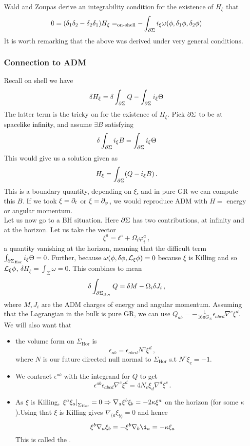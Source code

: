 \documentclass{article}
\begin{document}
Wald and Zoupas derive an integrability condition for the existence of $H_\xi$ that 
\begin{align*}
	0 = (\delta_1 \delta_2 - \delta_2 \delta_1) H_\xi =_{\text{on-shell}} - \int_{\partial \Sigma } i_\xi \omega(\phi, \delta_1 \phi, \delta_2 \phi)
\end{align*}
It is worth remarking that the above was derived under very general conditions. 

\subsubsection{Connection to ADM}
Recall on shell we have 
\[
\delta H_\xi = \delta \int_{\partial \Sigma} Q - \int_{\partial \Sigma} i_\xi \Theta
\]
The latter term is the tricky on for the existence of $H_\xi$. Pick $\partial \Sigma$ to be at spacelike infinity, and assume $\exists B$ satisfying 
\[
\delta \int_{\partial \Sigma} i_\xi B = \int_{\partial \Sigma} i_\xi \Theta
\]
This would give us a solution given as 
\[
H_\xi = \int_{\partial \Sigma} (Q-i_\xi B) \, .
\]
This is a boundary quantity, depending on $\xi$, and in pure GR we can compute this $B$. If we took $\xi = \partial_t$ or $\xi=\partial_\varphi$, we would reproduce ADM with $H=$ energy or angular momentum. \\
Let us now go to a BH situation. Here $\partial \Sigma$ has two contributions, at infinity and at the horizon. Let us take the vector 
\[
\xi^a = t^a + \Omega_i \varphi_i^a \, ,
\]
a quantity vanishing at the horizon, meaning that the difficult term $\int_{\partial \Sigma_{\text{Hor}}} i_\xi \Theta = 0$. Further, because $\omega(\phi, \delta \phi, \mathcal{L}_\xi \phi)=0$ because $\xi$ is Killing and so $\mathcal{L}_\xi \phi$, $\delta H_\xi =\int_\Sigma \omega = 0$. This combines to mean 
\[
\delta \int_{\partial \Sigma_{\text{Hor}}} Q = \delta M - \Omega_i \delta J_i \, ,
\]
where $M, J_i$ are the ADM charges of energy and angular momentum. Assuming that the Lagrangian in the bulk is pure GR, we can use $Q_{ab} = -\frac{1}{16 \pi G_N} \epsilon_{abcd} \nabla^c \xi^d$. We will also want that 
\begin{itemize}
	\item the volume form on $\Sigma_{\text{Hor}}$ is 
	\[
	\epsilon_{ab} = \epsilon_{abcd} N^c \xi^d \, , 
	\]
	where $N$ is our future directed null normal to $\Sigma_{\text{Hor}}$ s.t $N^c \xi_c = -1$. 
	\item We contract $\epsilon^{ab}$ with the integrand for $Q$ to get 
	\[
	\epsilon^{ab} \epsilon_{abcd} \nabla^c \xi^d = 4 N_c \xi_d \nabla^d \xi^c \, .  
	\]
	\item As $\xi$ is Killing, $\left. \xi^a \xi_a \right\rvert_{\Sigma_{\text{Hor}}} = 0 \Rightarrow \nabla_a \xi^b \xi_b = -2 \kappa \xi^a$ on the horizon (for some $\kappa$).Using that $\xi$ is Killing gives $\nabla_{(a}\xi_{b)}=0$ and hence 
	\[
	\xi^b \nabla_a \xi_b = -\xi^b \nabla_b \i_a = -\kappa \xi_a 
	\] 
	This is called the . 
\end{itemize}
\end{document}
